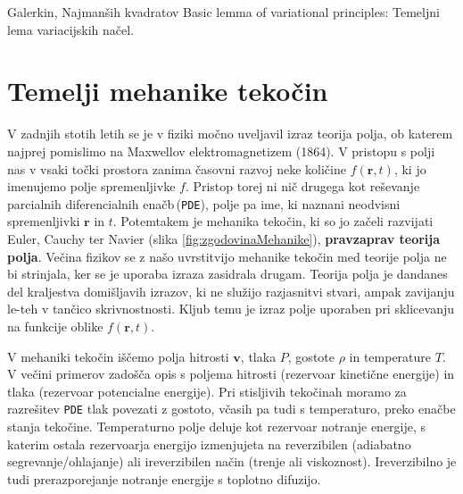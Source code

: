 \documentclass[11pt,a4paper,notitlepage]{article}%
\begin{document}
	Galerkin, Najmanših kvadratov \cite{JiangB-LSFEM}
	Basic lemma of variational principles: Temeljni lema variacijskih načel.


	\section{Temelji mehanike tekočin}
		V zadnjih stotih letih se je v fiziki močno uveljavil izraz teorija polja, ob katerem najprej pomislimo na Maxwellov elektromagnetizem (1864). V pristopu s polji nas v vsaki točki prostora zanima časovni razvoj neke količine $f(\mathbf{r},t)$, ki jo imenujemo polje spremenljivke $f$. Pristop torej ni nič drugega kot reševanje parcialnih diferencialnih enačb\,(\texttt{PDE}), polje pa ime, ki naznani neodvisni spremenljivki $\mathbf{r}$ in $t$. Potemtakem je mehanika tekočin, ki so jo začeli razvijati Euler, Cauchy ter Navier (slika \ref{fig:zgodovinaMehanike}), \textbf{pravzaprav teorija polja}. Večina fizikov se z našo uvrstitvijo mehanike tekočin med teorije polja ne bi strinjala, ker se je uporaba izraza zasidrala drugam. Teorija polja je dandanes del kraljestva domišljavih izrazov, ki ne služijo razjasnitvi stvari, ampak zavijanju le-teh v tančico skrivnostnosti. Kljub temu je izraz polje uporaben pri sklicevanju na funkcije oblike $f(\mathbf{r},t)$.
		
		V mehaniki tekočin iščemo polja hitrosti $\mathbf{v}$, tlaka $P$, gostote $\rho$ in temperature $T$. V večini primerov zadošča opis s poljema hitrosti (rezervoar kinetične energije) in tlaka (rezervoar potencialne energije). Pri stisljivih tekočinah moramo za razrešitev \texttt{PDE} tlak povezati z gostoto, včasih pa tudi s temperaturo, preko enačbe stanja tekočine. Temperaturno polje deluje kot rezervoar notranje energije, s katerim ostala rezervoarja energijo izmenjujeta na reverzibilen (adiabatno segrevanje/ohlajanje) ali ireverzibilen način (trenje ali viskoznost). Ireverzibilno je tudi prerazporejanje notranje energije s toplotno difuzijo.
\end{document}
